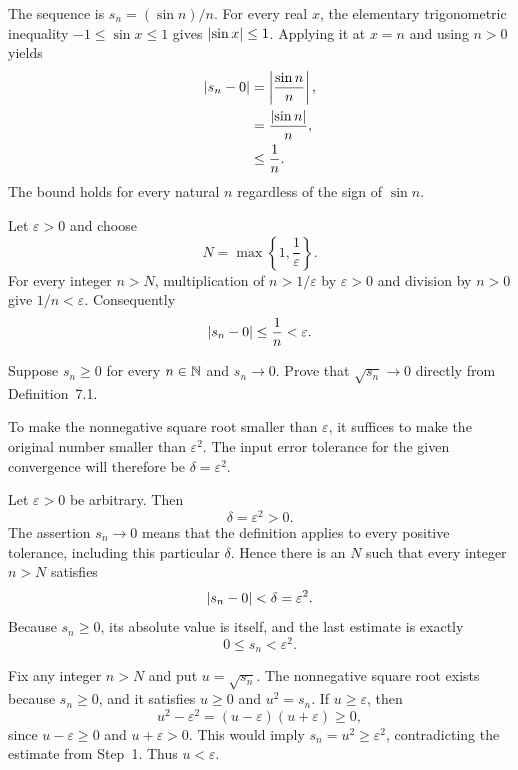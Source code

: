 The sequence is $s_n=(\sin n)/n$. For every real $x$, the elementary
trigonometric inequality $-1\le\sin x\le1$ gives
$\left|\sin x\right|\le1$. Applying it at $x=n$ and using $n>0$ yields
\begin{align*}
 \left|s_n-0\right|
   &=\left|\frac{\sin n}{n}\right|,\\
   &=\frac{\left|\sin n\right|}{n},\\
   &\le\frac1n.
\end{align*}
The bound holds for every natural $n$ regardless of the sign of
$\sin n$.

Let $\varepsilon>0$ and choose
\[
 N=\max\left\{1,\frac1\varepsilon\right\}.
\]
For every integer $n>N$, multiplication of $n>1/\varepsilon$ by
$\varepsilon>0$ and division by $n>0$ give $1/n<\varepsilon$.
Consequently
\[
 \left|s_n-0\right|\le\frac1n<\varepsilon.
\]



\goal Suppose $s_n\ge0$ for every $n\in\mathbb{N}$ and $s_n\to0$. Prove
that $\sqrt{s_n}\to0$ directly from Definition~7.1.

\idea To make the nonnegative square root smaller than
$\varepsilon$, it suffices to make the original number smaller than
$\varepsilon^2$. The input error tolerance for the given convergence
will therefore be $\delta=\varepsilon^2$.

Let $\varepsilon>0$ be arbitrary. Then
\[
 \delta=\varepsilon^2>0.
\]
The assertion $s_n\to0$ means that the definition applies to every
positive tolerance, including this particular $\delta$. Hence there is
an $N$ such that every integer $n>N$ satisfies
\[
 \left|s_n-0\right|<\delta=\varepsilon^2.
\]
Because $s_n\ge0$, its absolute value is itself, and the last estimate
is exactly
\[
 0\le s_n<\varepsilon^2.
\]

Fix any integer $n>N$ and put $u=\sqrt{s_n}$. The nonnegative square
root exists because $s_n\ge0$, and it satisfies $u\ge0$ and $u^2=s_n$.
If $u\ge\varepsilon$, then
\[
 u^2-\varepsilon^2=(u-\varepsilon)(u+\varepsilon)\ge0,
\]
since $u-\varepsilon\ge0$ and $u+\varepsilon>0$. This would imply
$s_n=u^2\ge\varepsilon^2$, contradicting the estimate from Step~1.
Thus $u<\varepsilon$.

